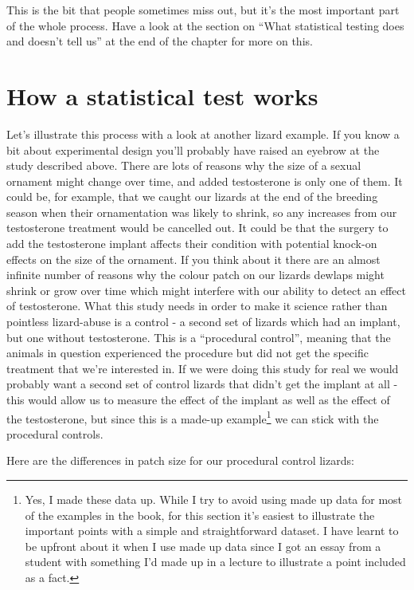 \documentclass[
]{book}
\begin{document}
This is the bit that people sometimes miss out, but it's the most important part of the whole process. Have a look at the section on ``What statistical testing does and doesn't tell us'' at the end of the chapter for more on this.

\hypertarget{how-a-statistical-test-works}{%
\section{How a statistical test works}\label{how-a-statistical-test-works}}

Let's illustrate this process with a look at another lizard example. If you know a bit about experimental design you'll probably have raised an eyebrow at the study described above. There are lots of reasons why the size of a sexual ornament might change over time, and added testosterone is only one of them. It could be, for example, that we caught our lizards at the end of the breeding season when their ornamentation was likely to shrink, so any increases from our testosterone treatment would be cancelled out. It could be that the surgery to add the testosterone implant affects their condition with potential knock-on effects on the size of the ornament. If you think about it there are an almost infinite number of reasons why the colour patch on our lizards dewlaps might shrink or grow over time which might interfere with our ability to detect an effect of testosterone. What this study needs in order to make it science rather than pointless lizard-abuse is a control - a second set of lizards which had an implant, but one without testosterone. This is a ``procedural control'', meaning that the animals in question experienced the procedure but did not get the specific treatment that we're interested in. If we were doing this study for real we would probably want a second set of control lizards that didn't get the implant at all - this would allow us to measure the effect of the implant as well as the effect of the testosterone, but since this is a made-up example\footnote{Yes, I made these data up. While I try to avoid using made up data for most of the examples in the book, for this section it's easiest to illustrate the important points with a simple and straightforward dataset. I have learnt to be upfront about it when I use made up data since I got an essay from a student with something I'd made up in a lecture to illustrate a point included as a fact.} we can stick with the procedural controls.

Here are the differences in patch size for our procedural control lizards:
\end{document}

